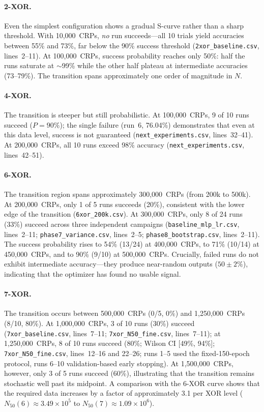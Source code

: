 \paragraph{2-XOR.}
Even the simplest configuration shows a gradual S-curve rather than a sharp
threshold.  With 10{,}000~CRPs, \emph{no} run succeeds---all 10 trials yield
accuracies between 55\% and 73\%, far below the 90\% success threshold
(\texttt{2xor\_baseline.csv}, lines~2--11).  At 100{,}000~CRPs, success
probability reaches only 50\%: half the runs saturate at $\sim$99\% while the
other half plateau at intermediate accuracies (73--79\%).  The transition spans approximately one order of
magnitude in $N$.

\paragraph{4-XOR.}
The transition is steeper but still probabilistic.  At 100{,}000~CRPs, 9 of
10 runs succeed ($P=90\%$); the single failure (run~6, 76.04\%) demonstrates
that even at this data level, success is not guaranteed
(\texttt{next\_experiments.csv}, lines~32--41).  At 200{,}000~CRPs, all 10
runs exceed 98\% accuracy (\texttt{next\_experiments.csv}, lines~42--51).

\paragraph{6-XOR.}
The transition region spans approximately 300{,}000~CRPs (from 200k to 500k).
At 200{,}000~CRPs, only 1 of 5 runs succeeds (20\%), consistent with the
lower edge of the transition (\texttt{6xor\_200k.csv}).  At 300{,}000~CRPs,
only 8 of 24 runs (33\%) succeed across three independent
campaigns (\texttt{baseline\_mlp\_lr.csv}, lines~2--11;
\texttt{phase7\_variance.csv}, lines~2--5;
\texttt{phase8\_bootstrap.csv}, lines~2--11).  The success probability
rises to 54\% (13/24) at 400{,}000~CRPs, to 71\% (10/14) at
450{,}000~CRPs, and to 90\% (9/10) at 500{,}000~CRPs.
Crucially, failed runs do not exhibit intermediate accuracy---they produce
near-random outputs ($50\pm2\%$), indicating that the optimizer has found no
usable signal.

\paragraph{7-XOR.}
The transition occurs between 500{,}000~CRPs (0/5, 0\%) and
1{,}250{,}000~CRPs (8/10, 80\%).  At 1{,}000{,}000~CRPs, 3 of 10 runs (30\%)
succeed (\texttt{7xor\_baseline.csv}, lines~7--11;
\texttt{7xor\_N50\_fine.csv}, lines~7--11); at 1{,}250{,}000~CRPs, 8 of 10
runs succeed (80\%; Wilson CI [49\%, 94\%]; \texttt{7xor\_N50\_fine.csv},
lines~12--16 and 22--26; runs 1--5 used the fixed-150-epoch protocol,
runs 6--10 validation-based early stopping).  At 1{,}500{,}000~CRPs, however,
only 3 of 5 runs
succeed (60\%), illustrating that the transition remains stochastic well
past its midpoint.  A comparison with the 6-XOR curve shows that the required data
increases by a factor of approximately 3.1 per XOR level ($N_{50}(6) \approx
3.49\times10^5$ to $N_{50}(7) \approx 1.09\times10^6$).

